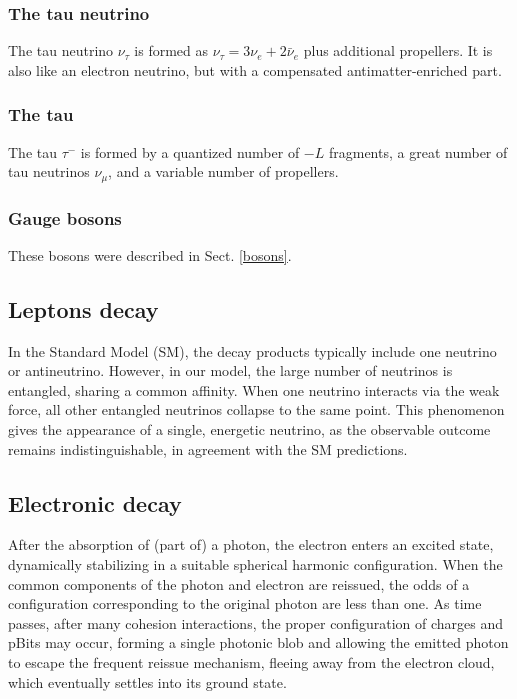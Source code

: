 \documentclass[12pt]{article}
\begin{document}
\subsubsection{The tau neutrino}
The tau neutrino $\nu_{\tau}$ is formed as $\nu_{\tau}=3\nu_e+2\bar{\nu}_e$ plus additional propellers. It is also like an electron neutrino, but with a compensated antimatter-enriched part.

\subsubsection{The tau}
The tau $\tau^-$ is formed by a quantized number of $-L$ fragments, a great number of tau neutrinos $\nu_{\mu}$, and a variable number of propellers.

\subsubsection{Gauge bosons}
These bosons were described in Sect. \ref{bosons}.

\subsection{Leptons decay}
In the Standard Model (SM), the decay products typically include one neutrino or antineutrino. However, in our model, the large number of neutrinos is entangled, sharing a common affinity. When one neutrino interacts via the weak force, all other entangled neutrinos collapse to the same point. This phenomenon gives the appearance of a single, energetic neutrino, as the observable outcome remains indistinguishable, in agreement with the SM predictions.

\subsection{Electronic decay}
After the absorption of (part of) a photon, the electron enters an excited state, dynamically stabilizing in a suitable spherical harmonic configuration. When the common components of the photon and electron are reissued, the odds of a configuration corresponding to the original photon are less than one. As time passes, after many cohesion interactions, the proper configuration of charges and pBits may occur, forming a single photonic blob and allowing the emitted photon to escape the frequent reissue mechanism, fleeing away from the electron cloud, which eventually settles into its ground state.
\end{document}
